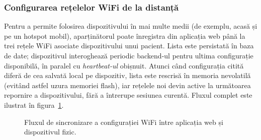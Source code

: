 \documentclass[12pt,a4paper]{article}
\begin{document}
\subsubsection{Configurarea rețelelor WiFi de la distanță}

Pentru a permite folosirea dispozitivului în mai multe medii (de exemplu, acasă și pe un hotspot mobil), aparținătorul poate înregistra din aplicația web până la trei rețele WiFi asociate dispozitivului unui pacient. Lista este persistată în baza de date; dispozitivul interoghează periodic backend-ul pentru ultima configurație disponibilă, în paralel cu \textit{heartbeat-ul} obișnuit. Atunci când configurația citită diferă de cea salvată local pe dispozitiv, lista este rescrisă în memoria nevolatilă (evitând astfel uzura memoriei flash), iar rețelele noi devin active la următoarea repornire a dispozitivului, fără a întrerupe sesiunea curentă. Fluxul complet este ilustrat în figura~\ref{fig:wifi-flow}.

\begin{figure}[H]
\centering
{}
\caption{Fluxul de sincronizare a configurației WiFi între aplicația web și dispozitivul fizic.}
\label{fig:wifi-flow}
\end{figure}
\end{document}
